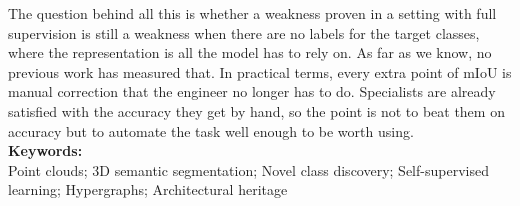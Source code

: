 The question behind all this is whether a weakness proven in a setting with full
supervision is still a weakness when there are no labels for the target classes,
where the representation is all the model has to rely on. As far as we know, no
previous work has measured that. In practical terms, every extra point of mIoU is
manual correction that the engineer no longer has to do. Specialists are already
satisfied with the accuracy they get by hand, so the point is not to beat them on
accuracy but to automate the task well enough to be worth using. \\

\noindent \textbf{Keywords:}\\
\noindent Point clouds; 3D semantic segmentation; Novel class discovery;
Self-supervised learning; Hypergraphs; Architectural heritage

